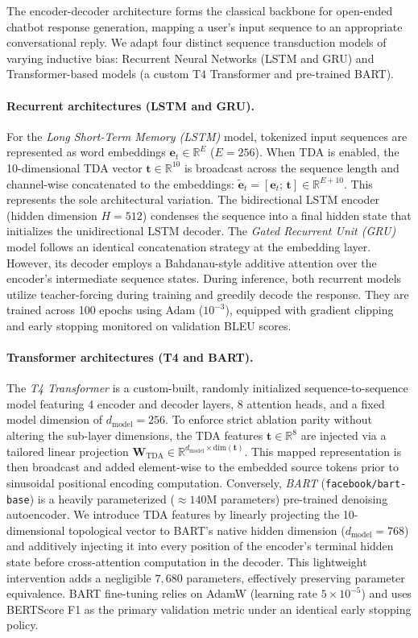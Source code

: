 \documentclass{article}
\begin{document}
The encoder-decoder architecture forms the classical backbone for open-ended chatbot response generation, mapping a user's input sequence to an appropriate conversational reply. We adapt four distinct sequence transduction models of varying inductive bias: Recurrent Neural Networks (LSTM and GRU) and Transformer-based models (a custom T4 Transformer and pre-trained BART).

\paragraph{Recurrent architectures (LSTM and GRU).} 
For the \emph{Long Short-Term Memory (LSTM)} model, tokenized input sequences are represented as word embeddings $\mathbf{e}_t \in \mathbb{R}^{E}$ ($E=256$). When TDA is enabled, the 10-dimensional TDA vector $\mathbf{t} \in \mathbb{R}^{10}$ is broadcast across the sequence length and channel-wise concatenated to the embeddings: $\tilde{\mathbf{e}}_t = [\mathbf{e}_t;\, \mathbf{t}] \in \mathbb{R}^{E + 10}$. This represents the sole architectural variation. The bidirectional LSTM encoder (hidden dimension $H=512$) condenses the sequence into a final hidden state that initializes the unidirectional LSTM decoder.
The \emph{Gated Recurrent Unit (GRU)} model follows an identical concatenation strategy at the embedding layer. However, its decoder employs a Bahdanau-style additive attention over the encoder's intermediate sequence states. During inference, both recurrent models utilize teacher-forcing during training and greedily decode the response. They are trained across 100 epochs using Adam ($10^{-3}$), equipped with gradient clipping and early stopping monitored on validation BLEU scores.

\paragraph{Transformer architectures (T4 and BART).}
The \emph{T4 Transformer} is a custom-built, randomly initialized sequence-to-sequence model featuring 4 encoder and decoder layers, 8 attention heads, and a fixed model dimension of $d_{\mathrm{model}} = 256$. To enforce strict ablation parity without altering the sub-layer dimensions, the TDA features $\mathbf{t} \in \mathbb{R}^{8}$ are injected via a tailored linear projection $\mathbf{W}_{\mathrm{TDA}} \in \mathbb{R}^{d_{\text{model}} \times \text{dim}(\mathbf{t})}$. This mapped representation is then broadcast and added element-wise to the embedded source tokens prior to sinusoidal positional encoding computation.
Conversely, \emph{BART} (\texttt{facebook/bart-base}) is a heavily parameterized ($\approx 140$M parameters) pre-trained denoising autoencoder. We introduce TDA features by linearly projecting the 10-dimensional topological vector to BART's native hidden dimension ($d_{\text{model}} = 768$) and additively injecting it into every position of the encoder's terminal hidden state before cross-attention computation in the decoder. This lightweight intervention adds a negligible $7{,}680$ parameters, effectively preserving parameter equivalence. BART fine-tuning relies on AdamW (learning rate $5\times10^{-5}$) and uses BERTScore F1 as the primary validation metric under an identical early stopping policy.
\end{document}
